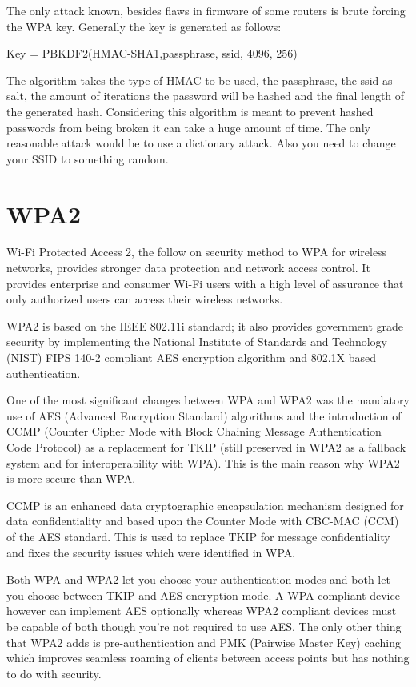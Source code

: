 \documentclass[a4paper,12pt,pagesize,headsepline,bibtotoc,titlepage]{scrartcl}
\begin{document}
The only attack known, besides flaws in firmware of some routers is brute forcing the WPA key. Generally the key is generated as follows:

Key = PBKDF2(HMAC-SHA1,passphrase, ssid, 4096, 256)

The algorithm takes the type of HMAC to be used, the passphrase, the ssid as salt, the amount of iterations the password will be hashed and the final length of the generated hash. Considering this algorithm is meant to prevent hashed passwords from being broken it can take a huge amount of time. The only reasonable attack would be to use a dictionary attack. Also you need to change your SSID to something random.


\section{WPA2}

Wi-Fi Protected Access 2, the follow on security method to WPA for wireless networks, provides stronger data protection and network access control. It provides enterprise and consumer Wi-Fi users with a high level of assurance that only authorized users can access their wireless networks. 

WPA2 is based on the IEEE 802.11i standard; it also provides government grade security by implementing the National Institute of Standards and Technology (NIST) FIPS 140-2 compliant AES encryption algorithm and 802.1X based authentication. 

One of the most significant changes between WPA and WPA2 was the mandatory use of AES (Advanced Encryption Standard) algorithms and the introduction of CCMP (Counter Cipher Mode with Block Chaining Message Authentication Code Protocol) as a replacement for TKIP (still preserved in WPA2 as a fallback system and for interoperability with WPA). This is the main reason why WPA2 is more secure than WPA.

CCMP is an enhanced data cryptographic encapsulation mechanism designed for data confidentiality and based upon the Counter Mode with CBC-MAC (CCM) of the AES standard. This is used to replace TKIP for message confidentiality and fixes the security issues which were identified in WPA.

Both WPA and WPA2 let you choose your authentication modes and both let you choose between TKIP and AES encryption mode.  A WPA compliant device however can implement AES optionally whereas WPA2 compliant devices must be capable of both though you're not required to use AES.  The only other thing that WPA2 adds is pre-authentication and PMK (Pairwise Master Key) caching which improves seamless roaming of clients between access points but has nothing to do with security.
\end{document}
